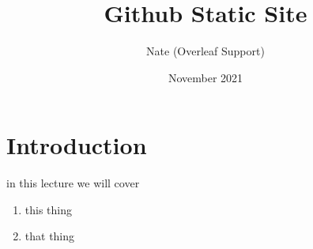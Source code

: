 \documentclass{article}
\title{Github Static Site}
\author{Nate (Overleaf Support)}
\date{November 2021}
\begin{document}
\maketitle

\section{Introduction}

in this lecture we will cover
\begin{enumerate}
    \item this thing
    \item that thing
\end{enumerate}
\end{document}

